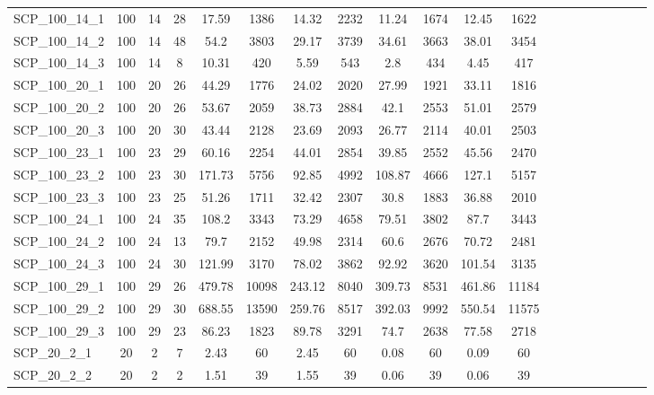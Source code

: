 \begin{sidewaystable}[!ht]
{\begin{tabular}{lccccccccccccccccccc}
SCP\_100\_14\_1 & 100 & 14 & 28 & 17.59 & 1386 & 14.32 & 2232 &  \textcolor{blue2}{11.24} & 1674 & 12.45 & 1622 \\
SCP\_100\_14\_2 & 100 & 14 & 48 & 54.2 & 3803 &  \textcolor{blue2}{29.17} & 3739 & 34.61 & 3663 & 38.01 & 3454 \\
SCP\_100\_14\_3 & 100 & 14 & 8 & 10.31 & 420 & 5.59 & 543 &  \textcolor{blue2}{2.8} & 434 & 4.45 & 417 \\
SCP\_100\_20\_1 & 100 & 20 & 26 & 44.29 & 1776 &  \textcolor{blue2}{24.02} & 2020 & 27.99 & 1921 & 33.11 & 1816 \\
SCP\_100\_20\_2 & 100 & 20 & 26 & 53.67 & 2059 &  \textcolor{blue2}{38.73} & 2884 & 42.1 & 2553 & 51.01 & 2579 \\
SCP\_100\_20\_3 & 100 & 20 & 30 & 43.44 & 2128 &  \textcolor{blue2}{23.69} & 2093 & 26.77 & 2114 & 40.01 & 2503 \\
SCP\_100\_23\_1 & 100 & 23 & 29 & 60.16 & 2254 & 44.01 & 2854 &  \textcolor{blue2}{39.85} & 2552 & 45.56 & 2470 \\
SCP\_100\_23\_2 & 100 & 23 & 30 & 171.73 & 5756 &  \textcolor{blue2}{92.85} & 4992 & 108.87 & 4666 & 127.1 & 5157 \\
SCP\_100\_23\_3 & 100 & 23 & 25 & 51.26 & 1711 & 32.42 & 2307 &  \textcolor{blue2}{30.8} & 1883 & 36.88 & 2010 \\
SCP\_100\_24\_1 & 100 & 24 & 35 & 108.2 & 3343 &  \textcolor{blue2}{73.29} & 4658 & 79.51 & 3802 & 87.7 & 3443 \\
SCP\_100\_24\_2 & 100 & 24 & 13 & 79.7 & 2152 &  \textcolor{blue2}{49.98} & 2314 & 60.6 & 2676 & 70.72 & 2481 \\
SCP\_100\_24\_3 & 100 & 24 & 30 & 121.99 & 3170 &  \textcolor{blue2}{78.02} & 3862 & 92.92 & 3620 & 101.54 & 3135 \\
SCP\_100\_29\_1 & 100 & 29 & 26 & 479.78 & 10098 &  \textcolor{blue2}{243.12} & 8040 & 309.73 & 8531 & 461.86 & 11184 \\
SCP\_100\_29\_2 & 100 & 29 & 30 & 688.55 & 13590 &  \textcolor{blue2}{259.76} & 8517 & 392.03 & 9992 & 550.54 & 11575 \\
SCP\_100\_29\_3 & 100 & 29 & 23 & 86.23 & 1823 & 89.78 & 3291 & 74.7 & 2638 & 77.58 & 2718 \\
SCP\_20\_2\_1 & 20 & 2 & 7 & 2.43 & 60 & 2.45 & 60 &  \textcolor{blue2}{0.08} & 60 & 0.09 & 60 \\
SCP\_20\_2\_2 & 20 & 2 & 2 & 1.51 & 39 & 1.55 & 39 &  \textcolor{blue2}{0.06} & 39 &  \textcolor{blue2}{0.06} & 39 \\

\end{tabular}}
\end{sidewaystable}
